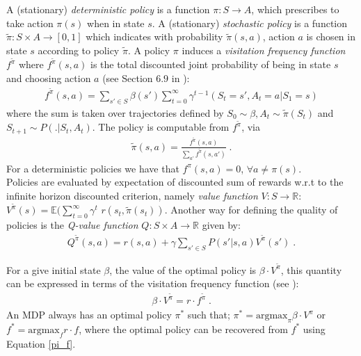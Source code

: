 \documentclass[runningheads,a4paper]{llncs}
\begin{document}
A (stationary) \textit{deterministic policy} is a function $\pi: S \longrightarrow A$, which prescribes to take action $\pi(s)$ when in state $s$. A (stationary) \textit{stochastic policy} is a function $\tilde{\pi}: S \times A \longrightarrow [0,1]$ which indicates with probability $\tilde{\pi} (s,a)$, action $a$ is chosen in state $s$ according to policy $\tilde{\pi}$. A policy $\pi$ induces a \textit{visitation frequency function} $f^{\tilde{\pi}}$ where $f^{\tilde{\pi}}(s,a)$ is the total discounted joint probability of being in state $s$ and choosing action $a$ (see Section $6.9$ in \cite{Puterman1994}):
\begin{align*}
f^{\tilde{\pi}}(s, a) = \sum_{s' \in S} \beta(s') \sum_{t=0}^{\infty} \gamma^{t-1}(S_t = s', A_t = a | S_1 = s)
\end{align*}
where the sum is taken over trajectories defined by $S_0 \sim \beta, A_t \sim \tilde{\pi}(S_t)$ and $S_{t+1} \sim P(.|S_t,A_t)$. The policy is computable from $f^{\tilde{\pi}}$, via 
\begin{align}\label{pi_f}
\tilde{\pi}(s,a) = \frac{f^{\tilde{\pi}}(s, a)}{\sum_{a'} f^{\tilde{\pi}} (s,a')}\;.
\end{align}
For a deterministic policies we have that $f^{\pi}(s,a)= 0$, $\forall a \neq \pi(s)$.\\
Policies are evaluated by expectation of discounted sum of rewards w.r.t to the infinite horizon discounted criterion, namely \textit{value function} $V: S \longrightarrow \mathbb{R}$: 
$V^{\tilde{\pi}}(s) = \mathbb{E}(\sum_{t=0}^{\infty} \gamma^{t}$ $r(s_t, \tilde{\pi}(s_t))$. %
Another way for defining the quality of policies is the \textit{Q-value function}   $Q: S \times A \longrightarrow \mathbb{R}$ given by:
\begin{align}\label{q-v}
Q^{\tilde{\pi}}(s, a) = r(s, a) + \gamma \sum_{s' \in S} P(s'|s,a)V^{\tilde{\pi}}(s')\;.
\end{align}

For a give initial state $\beta$, the value of the optimal policy is $\beta \cdot V^{\tilde{\pi}}$, this quantity can be expressed in terms of the visitation frequency function (see \cite{Puterman1994}): 
\begin{align}\label{f-v}
\beta \cdot V^{\tilde{\pi}} = r \cdot f^{\tilde{\pi}}\;.
\end{align}
An MDP always has an optimal policy $\pi^*$ such that; $\pi^* = \text{argmax}_{\pi} \beta \cdot V^{\pi}$ or $f^{*} = \text{argmax}_{f} r \cdot f$, where the optimal policy can be recovered from $f^*$ using Equation \ref{pi_f}. 
\end{document}
